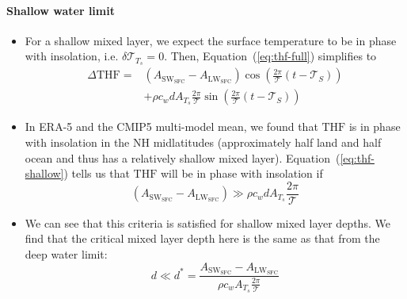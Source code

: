 \documentclass{ametsocV5}
\begin{document}
  \paragraph{Shallow water limit}
  \begin{itemize}
  \item For a shallow mixed layer, we expect the surface temperature to be in phase with insolation, i.e. $\delta\mathscr{T}_{T_{s}} = 0$. Then, Equation~(\ref{eq:thf-full}) simplifies to
        \begin{equation} \label{eq:thf-shallow}
          \begin{aligned}
            \Delta \mathrm{THF} =& \left( A_{\mathrm{SW_{SFC}}} - A_{\mathrm{LW_{SFC}}} \right) \cos\left(\frac{2\pi}{\mathcal{T}}(t-\mathscr{T}_{S})\right) \\
            &+ \rho c_{w}d A_{T_{s}}\frac{2\pi}{\mathcal{T}} \sin\left(\frac{2\pi}{\mathcal{T}}(t-\mathscr{T}_{S})\right)
          \end{aligned}
        \end{equation}
  \item In ERA-5 and the CMIP5 multi-model mean, we found that $\mathrm{THF}$ is in phase with insolation in the NH midlatitudes (approximately half land and half ocean and thus has a relatively shallow mixed layer). Equation~(\ref{eq:thf-shallow}) tells us that $\mathrm{THF}$ will be in phase with insolation if
        \begin{equation} \label{eq:in-phase}
          \left(A_{\mathrm{SW_{SFC}}} - A_{\mathrm{LW_{SFC}}} \right) \gg \rho c_{w}d A_{T_{s}}\frac{2\pi}{\mathcal{T}}
        \end{equation}
  \item We can see that this criteria is satisfied for shallow mixed layer depths. We find that the critical mixed layer depth here is the same as that from the deep water limit:
        \begin{equation} \label{eq:d-shallow}
          d \ll d^{*} = \frac{A_{\mathrm{SW_{SFC}}}-A_{\mathrm{LW_{SFC}}}}{\rho c_{w} A_{T_{s}}\frac{2\pi}{\mathcal{T}}}
        \end{equation}
  \end{itemize}


\end{document}
